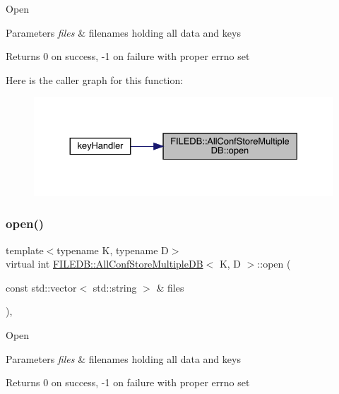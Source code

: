 Open 
\begin{DoxyParams}{Parameters}
{\em files} & filenames holding all data and keys\\
\hline
\end{DoxyParams}
\begin{DoxyReturn}{Returns}
0 on success, -\/1 on failure with proper errno set 
\end{DoxyReturn}
Here is the caller graph for this function\+:\nopagebreak
\begin{figure}[H]
\begin{center}
\leavevmode
\includegraphics[width=330pt]{d5/dbe/classFILEDB_1_1AllConfStoreMultipleDB_aa006283e8d6f0f079ca234c369f53679_icgraph}
\end{center}
\end{figure}
\mbox{\label{classFILEDB_1_1AllConfStoreMultipleDB_aa006283e8d6f0f079ca234c369f53679}} 
\subsubsection{\texorpdfstring{open()}{open()}\hspace{0.1cm}{\footnotesize\ttfamily [2/2]}}
{\footnotesize\ttfamily template$<$typename K, typename D$>$ \\
virtual int \mbox{\hyperlink{classFILEDB_1_1AllConfStoreMultipleDB}{F\+I\+L\+E\+D\+B\+::\+All\+Conf\+Store\+Multiple\+DB}}$<$ K, D $>$\+::open (\begin{DoxyParamCaption}\item[{const std\+::vector$<$ std\+::string $>$ \&}]{files }\end{DoxyParamCaption})\hspace{0.3cm}{\ttfamily [inline]}, {\ttfamily [virtual]}}

Open 
\begin{DoxyParams}{Parameters}
{\em files} & filenames holding all data and keys\\
\hline
\end{DoxyParams}
\begin{DoxyReturn}{Returns}
0 on success, -\/1 on failure with proper errno set 
\end{DoxyReturn}
\mbox{\label{classFILEDB_1_1AllConfStoreMultipleDB_a746ef51b2dedf529a8e85528c0d31bfc}} 
